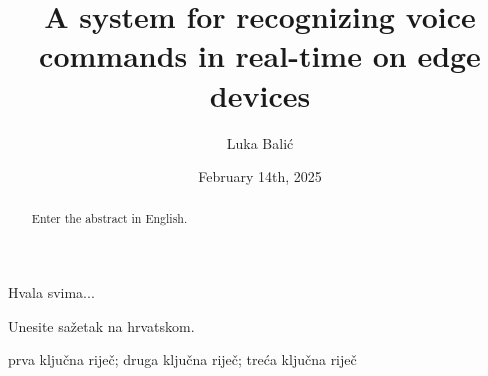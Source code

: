 \documentclass[diplomskirad]{fer}
\title{A system for recognizing voice commands in real-time on edge devices}
\author{Luka Balić}
\date{February 14th, 2025}
\begin{document}
\maketitle






\begin{zahvale}
  Hvala svima...
\end{zahvale}


\mainmatter


\tableofcontents

%












\begin{sazetak}
  Unesite sažetak na hrvatskom.

  
\end{sazetak}

\begin{kljucnerijeci}
  prva ključna riječ; druga ključna riječ; treća ključna riječ
\end{kljucnerijeci}


\begin{abstract}
  Enter the abstract in English.
  
 
\end{abstract}
\end{document}
